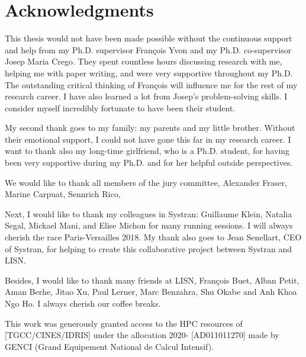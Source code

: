\chapter*{Acknowledgments}
This thesis would not have been made possible without the continuous support and help from my Ph.D. supervisor François Yvon and my Ph.D. co-supervisor Josep Maria Crego. They spent countless hours discussing research with me, helping me with paper writing, and were very supportive throughout my Ph.D. The outstanding critical thinking of François will influence me for the rest of my research career. I have also learned a lot from Josep's problem-solving skills. I consider myself incredibly fortunate to have been their student.

My second thank goes to my family: my parents and my little brother. Without their emotional support, I could not have gone this far in my research career. I want to thank also my long-time girlfriend, who is a Ph.D. student, for having been very supportive during my Ph.D. and for her helpful outside perspectives.

We would like to thank all members of the jury committee, Alexander Fraser, Marine Carpuat, Sennrich Rico, 

Next, I would like to thank my colleagues in Systran: Guillaume Klein, Natalia Segal, Mickael Mani, and Elise Michon for many running sessions. I will always cherish the race Paris-Versailles 2018. My thank also goes to Jean Senellart, CEO of Systran, for helping to create this collaborative project between Systran and LISN. 

Besides, I would like to thank many friends at LISN, François Buet, Alban Petit, Aman Berhe, Jitao Xu, Paul Lerner, Marc Benzahra, Shu Okabe and Anh Khoa Ngo Ho. I always cherish our coffee breaks.

This work was generously granted access to the HPC resources of [TGCC/CINES/IDRIS] under the allocation 2020- [AD011011270] made by GENCI (Grand Equipement National de Calcul Intensif).
